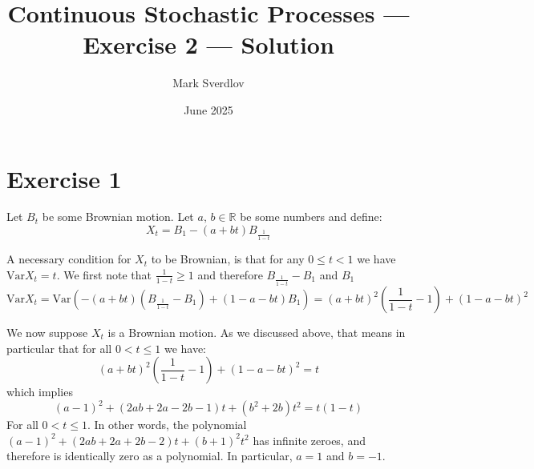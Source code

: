 \documentclass{amsart}
\title{Continuous Stochastic Processes --- Exercise 2 --- Solution}
\author{Mark Sverdlov}
\date{June 2025}
\theoremstyle{plain}
\theoremstyle{definition}
\theoremstyle{definition}
\theoremstyle{remark}
\begin{document}
    \maketitle
    \section{Exercise 1}
    Let \(B_{t}\) be some Brownian motion. Let \(a,\,b\in \mathbb{R}\) be some numbers and define:
    \begin{equation*}
        X_{t} = B_{1} - \left( a+bt \right)B_{\frac{1}{1-t}}
    \end{equation*}

A necessary condition for \(X_{t}\) to be Brownian, is that for any \(0\leq t < 1\) we have \(\mathrm{Var}X_{t} = t\). We first note that \(\frac{1}{1-t} \geq 1\) and therefore \(B_{\frac{1}{1-t}}-B_{1}\) and \(B_{1}\)
\begin{equation*}
    \mathrm{Var}X_{t} = \mathrm{Var} \left(-\left(a+bt\right)\left(B_{\frac{1}{1-t}}-B_{1}\right)+\left(1-a-bt\right)B_{1}\right)=\left(a+bt\right)^{2}\left(\frac{1}{1-t}-1\right)+\left(1-a-bt\right)^{2}
\end{equation*}


We now suppose \(X_{t}\) is a Brownian motion. As we discussed above, that means in particular that for all \(0 < t \leq 1\) we have:
\begin{equation*}
    \left(a+bt\right)^{2}\left(\frac{1}{1-t}-1\right)+\left(1-a-bt\right)^{2} = t
\end{equation*}
which implies
\begin{equation*}
    \label{eq:2}
    \left(a-1\right)^{2}+\left(2ab+2a-2b-1\right)t+\left(b^{2}+2b\right)t^{2} = t \left(1-t\right)
\end{equation*}
For all \(0<t\leq 1\). In other words, the polynomial \(\left(a-1\right)^{2}+\left(2ab+2a+2b-2\right)t+\left(b+1\right)^{2}t^{2}\) has infinite zeroes, and therefore is identically zero as a polynomial. In particular, \(a=1\) and \(b=-1\).
\end{document}
